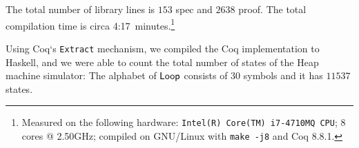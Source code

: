 The total number of library lines is $153$ spec and $2638$ proof.  The total compilation time is circa 4:17~minutes.\footnote{Measured on the
  following hardware: \texttt{Intel(R) Core(TM) i7-4710MQ CPU}; 8 cores @ 2.50GHz; compiled on GNU/Linux with \texttt{make -j8} and Coq 8.8.1.}

Using Coq`s \texttt{Extract} mechanism, we compiled the Coq implementation to Haskell, and we were able to count the total number of states of the
Heap machine simulator: The alphabet of $\mathsf{Loop}$ consists of $30$ symbols and it has $11537$ states.




